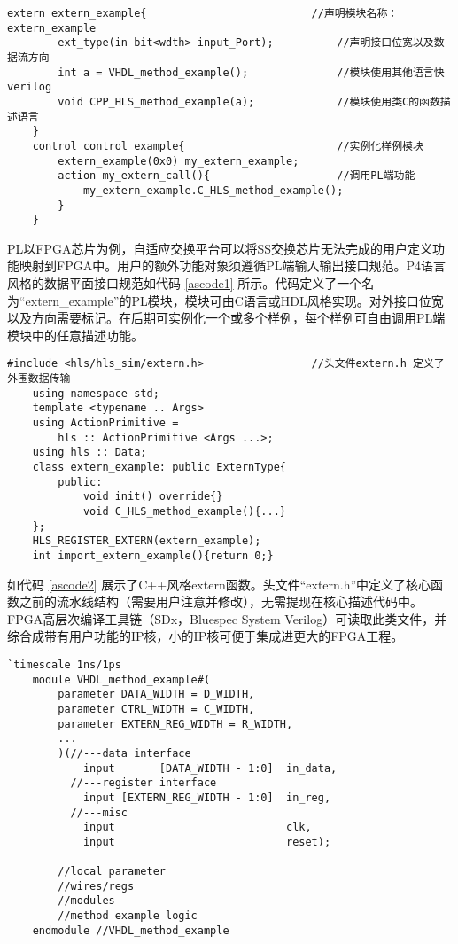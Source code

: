


{\fontsize{10pt}{0.5\baselineskip}\selectfont
	\begin{lstlisting}[caption={数据平面接口：PL端高层语言描述},label={ascode1}]
	extern extern_example{           				//声明模块名称：extern_example
		ext_type(in bit<wdth> input_Port);			//声明接口位宽以及数据流方向
		int a = VHDL_method_example();				//模块使用其他语言快verilog
		void CPP_HLS_method_example(a);				//模块使用类C的函数描述语言
	}
	control control_example{						//实例化样例模块
		extern_example(0x0) my_extern_example;
		action my_extern_call(){					//调用PL端功能
			my_extern_example.C_HLS_method_example();
		}
	}
	\end{lstlisting}
}

PL以FPGA芯片为例，自适应交换平台可以将SS交换芯片无法完成的用户定义功能映射到FPGA中。用户的额外功能对象须遵循PL端输入输出接口规范。P4语言风格的数据平面接口规范如代码 \ref{ascode1} 所示。代码定义了一个名为“extern\_example”的PL模块，模块可由C语言或HDL风格实现。对外接口位宽以及方向需要标记。在后期可实例化一个或多个样例，每个样例可自由调用PL端模块中的任意描述功能。

{\fontsize{10pt}{0.5\baselineskip}\selectfont
	\begin{lstlisting}[caption={extern实例的C++类声明},label={ascode2}]
	#include <hls/hls_sim/extern.h>					//头文件extern.h 定义了外围数据传输
	using namespace std;
	template <typename .. Args>
	using ActionPrimitive =
		hls :: ActionPrimitive <Args ...>;
	using hls :: Data;
	class extern_example: public ExternType{
		public:
			void init() override{}
			void C_HLS_method_example(){...}
	};
	HLS_REGISTER_EXTERN(extern_example);
	int import_extern_example(){return 0;}
	\end{lstlisting}
}

如代码 \ref{ascode2} 展示了C++风格extern函数。头文件“extern.h”中定义了核心函数之前的流水线结构（需要用户注意并修改），无需提现在核心描述代码中。FPGA高层次编译工具链（SDx，Bluespec System Verilog）可读取此类文件，并综合成带有用户功能的IP核，小的IP核可便于集成进更大的FPGA工程。

{\fontsize{10pt}{0.5\baselineskip}\selectfont
	\begin{lstlisting}[caption={extern实例的VHDL模块声明},label={ascode3}]
	`timescale 1ns/1ps
	module VHDL_method_example#(
		parameter DATA_WIDTH = D_WIDTH,
		parameter CTRL_WIDTH = C_WIDTH,
		parameter EXTERN_REG_WIDTH = R_WIDTH,
		...
		)(//---data interface
			input		[DATA_WIDTH - 1:0]	in_data,
		  //---register interface
		  	input [EXTERN_REG_WIDTH - 1:0]  in_reg,
		  //---misc
		  	input							clk,
		  	input							reset);
		  	
		//local parameter
		//wires/regs
		//modules
		//method example logic
	endmodule //VHDL_method_example
	\end{lstlisting}
}

